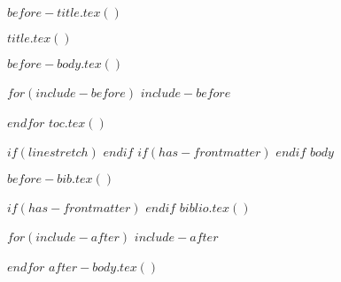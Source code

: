 $before-title.tex()$

$title.tex()$


$before-body.tex()$

$for(include-before)$
$include-before$

$endfor$
$toc.tex()$

$if(linestretch)$
$endif$
$if(has-frontmatter)$
\mainmatter
$endif$
$body$

$before-bib.tex()$

$if(has-frontmatter)$
\backmatter
$endif$
$biblio.tex()$

$for(include-after)$
$include-after$

$endfor$
$after-body.tex()$


